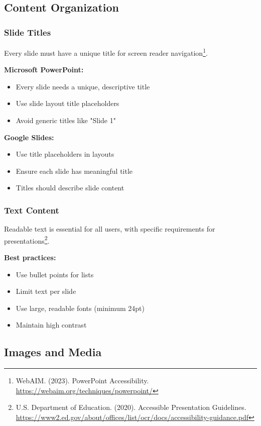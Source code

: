 \subsection{Content Organization}

\subsubsection{Slide Titles}
Every slide must have a unique title for screen reader navigation\footnote{WebAIM. (2023). PowerPoint Accessibility. \url{https://webaim.org/techniques/powerpoint/}}.

\textbf{Microsoft PowerPoint:}
\begin{itemize}
\item Every slide needs a unique, descriptive title
\item Use slide layout title placeholders
\item Avoid generic titles like "Slide 1"
\end{itemize}

\textbf{Google Slides:}
\begin{itemize}
\item Use title placeholders in layouts
\item Ensure each slide has meaningful title
\item Titles should describe slide content
\end{itemize}

\subsubsection{Text Content}
Readable text is essential for all users, with specific requirements for presentations\footnote{U.S. Department of Education. (2020). Accessible Presentation Guidelines. \url{https://www2.ed.gov/about/offices/list/ocr/docs/accessibility-guidance.pdf}}.

\textbf{Best practices:}
\begin{itemize}
\item Use bullet points for lists
\item Limit text per slide
\item Use large, readable fonts (minimum 24pt)
\item Maintain high contrast
\end{itemize}

\subsection{Images and Media}

